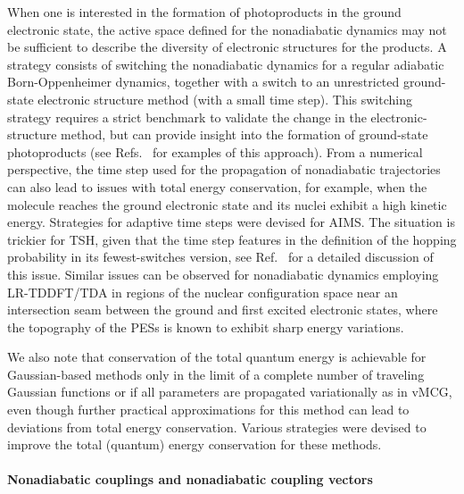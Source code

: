 \documentclass[9pt,bestpractices]{livecoms}
\begin{document}
When one is interested in the formation of photoproducts in the ground electronic state, the active space defined for the nonadiabatic dynamics may not be sufficient to describe the diversity of electronic structures for the products. A strategy consists of switching the nonadiabatic dynamics for a regular adiabatic Born-Oppenheimer dynamics, together with a switch to an unrestricted ground-state electronic structure method (with a small time step). This switching strategy requires a strict benchmark to validate the change in the electronic-structure method, but can provide insight into the formation of ground-state photoproducts (see Refs.~ for examples of this approach). 
From a numerical perspective, the time step used for the propagation of nonadiabatic trajectories can also lead to issues with total energy conservation, for example, when the molecule reaches the ground electronic state and its nuclei exhibit a high kinetic energy. Strategies for adaptive time steps were devised for AIMS.\cite{levine2008implementation} The situation is trickier for TSH, given that the time step features in the definition of the hopping probability in its fewest-switches version, see Ref.~ for a detailed discussion of this issue. Similar issues can be observed for nonadiabatic dynamics employing LR-TDDFT/TDA in regions of the nuclear configuration space near an intersection seam between the ground and first excited electronic states, where the topography of the PESs is known to exhibit sharp energy variations.\cite{levine06,tapavicza08,tavernelli09b,taylor2023description} 

We also note that conservation of the total quantum energy is achievable for Gaussian-based methods only in the limit of a complete number of traveling Gaussian functions\cite{habershon2012} or if all parameters are propagated variationally as in vMCG\cite{richings2015quantum}, even though further practical approximations for this method can lead to deviations from total energy conservation.\cite{christopoulou2021developing} Various strategies were devised to improve the total (quantum) energy conservation for these methods.\cite{izmaylov2022}

\paragraph{Nonadiabatic couplings and nonadiabatic coupling vectors} 
\end{document}
